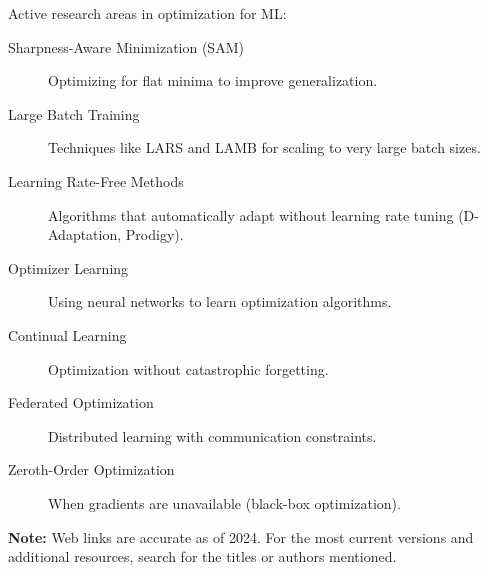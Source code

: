 \documentclass[../main.tex]{subfiles}
\begin{document}
Active research areas in optimization for ML:

\begin{description}
\item[Sharpness-Aware Minimization (SAM)] Optimizing for flat minima to improve generalization.

\item[Large Batch Training] Techniques like LARS and LAMB for scaling to very large batch sizes.

\item[Learning Rate-Free Methods] Algorithms that automatically adapt without learning rate tuning (D-Adaptation, Prodigy).

\item[Optimizer Learning] Using neural networks to learn optimization algorithms.

\item[Continual Learning] Optimization without catastrophic forgetting.

\item[Federated Optimization] Distributed learning with communication constraints.

\item[Zeroth-Order Optimization] When gradients are unavailable (black-box optimization).
\end{description}

\bigskip

\noindent
\textbf{Note:} Web links are accurate as of 2024. For the most current versions and additional resources, search for the titles or authors mentioned.
\end{document}
